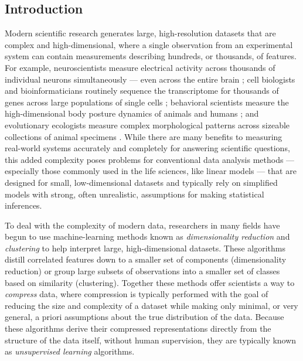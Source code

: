 \documentclass[11pt,a4paper,oneside]{book}
\begin{document}
\begin{doublespace}
\section{Introduction}
Modern scientific research generates large, high-resolution datasets that are complex and high-dimensional, where a single observation from an experimental system can contain measurements describing hundreds, or thousands, of features. For example, neuroscientists measure electrical activity across thousands of individual neurons simultaneously \citep{jun2017fully, stringer2019high, stringer2019spontaneous} --- even across the entire brain \citep{ahrens2012brain,ahrens2013whole}; cell biologists and bioinformaticians routinely sequence the transcriptome for thousands of genes across large populations of single cells \citep{samusik2016automated, la2018rna, becht2019dimensionality, linderman2019fast}; behavioral scientists measure the high-dimensional body posture dynamics of animals and humans \citep{stephens2008dimensionality, stephens2011emergence, kain2013leg, berman2014mapping, wiltschko2015mapping, klibaite2017unsupervised, Costa1501, cande2018optogenetic, mathis2018deeplabcut, chambers2019pose, gunel2019deepfly3d, graving2019deepposekit, klibaite2019interacting,
nath2019using,pereira2019fast, bala2020openmonkeystudio, ebbesen2020social, karashchuk2020anipose}; and evolutionary ecologists measure complex morphological patterns across sizeable collections of animal specimens \citep{cuthill2017biology, cuthill2019deep, ezray2019unsupervised, wham2019measuring, zhang2019shell}. While there are many benefits to measuring real-world systems accurately and completely for answering scientific questions, this added complexity poses problems for conventional data analysis methods --- especially those commonly used in the life sciences, like linear models \citep{bolker2009generalized} --- that are designed for small, low-dimensional datasets and typically rely on simplified models with strong, often unrealistic, assumptions for making statistical inferences.

To deal with the complexity of modern data, researchers in many fields have begun to use machine-learning methods known as \textit{dimensionality reduction} and \textit{clustering} to help interpret large, high-dimensional datasets. These algorithms distill correlated features down to a smaller set of components (dimensionality reduction) or group large subsets of observations into a smaller set of classes based on similarity (clustering). Together these methods offer scientists a way to \textit{compress} data, where compression is typically performed with the goal of reducing the size and complexity of a dataset while making only minimal, or very general, a priori assumptions about the true distribution of the data. Because these algorithms derive their compressed representations directly from the structure of the data itself, without human supervision, they are typically known as \textit{unsupervised learning} algorithms. 


\end{doublespace}
\end{document}
